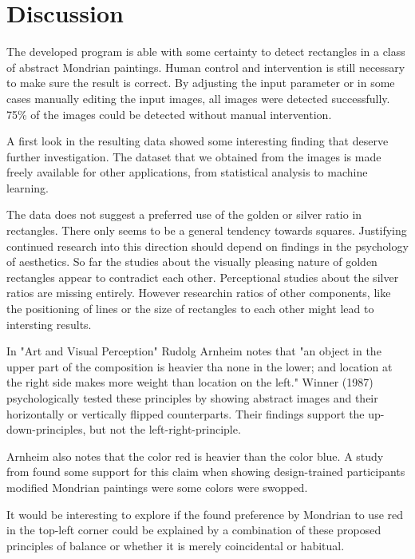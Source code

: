 \section{Discussion} \label{conclusion}

The developed program is able with some certainty to detect rectangles in
a class of abstract Mondrian paintings. Human control and intervention is still
necessary to make sure the result is correct. By adjusting the input parameter
or in some cases manually editing the input images, all images were detected
successfully. 75\% of the images could be detected without manual intervention.

A first look in the resulting data showed some interesting finding that deserve
further investigation. The dataset that we obtained from the images is made
freely available for other applications, from statistical analysis to machine
learning.

The data does not suggest a preferred use of the golden or silver ratio in
rectangles. There only seems to be a general tendency towards squares.
Justifying continued research into this direction should depend on findings in
the psychology of aesthetics. So far the studies about the visually pleasing
nature of golden rectangles appear to contradict each other. Perceptional
studies about the silver ratios are missing entirely. However researchin  ratios
of other components, like the positioning of lines or the size of rectangles to
each other might lead to intersting results.

In "Art and Visual Perception" Rudolg Arnheim \cite{Arnheim1965} notes that "an
object in the upper part of the composition is heavier tha none in the lower;
and location at the right side makes more weight than location on the left."
Winner (1987) \cite{Winner1987} psychologically tested these principles by
showing abstract images and their horizontally or vertically flipped
counterparts. Their findings support the up-down-principles, but not the
left-right-principle.

Arnheim also notes that the color red is heavier than the color blue. A study
from \cite{Locher2005} found some support for this claim when showing
design-trained participants modified Mondrian paintings were some colors were
swopped.

It would be interesting to explore if the found preference by Mondrian to use
red in the top-left corner could be explained by a combination of these proposed
principles of balance or whether it is merely coincidental or habitual.





